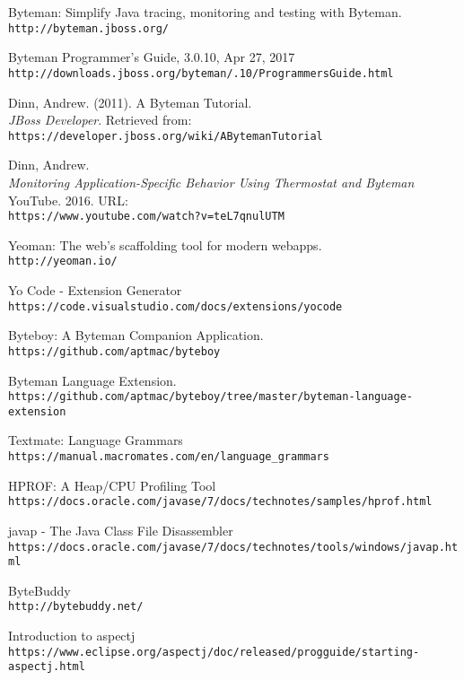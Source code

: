 \documentclass[letterpaper,twocolumn,10pt]{article}
\begin{document}
\begin{thebibliography}{99}

Byteman: Simplify Java tracing, monitoring and testing with Byteman.
\\\texttt{http://byteman.jboss.org/}

Byteman Programmer's Guide, 3.0.10, Apr 27, 2017
\\\texttt{http://downloads.jboss.org/byteman/.10/ProgrammersGuide.html}

Dinn, Andrew. (2011). A Byteman Tutorial. 
\\\textit{JBoss Developer}. Retrieved from: \\\texttt{https://developer.jboss.org/wiki/\newline ABytemanTutorial}

Dinn, Andrew. \\\textit{Monitoring Application-Specific Behavior Using Thermostat and Byteman}
YouTube. 2016. URL: \\\texttt{https://www.youtube.com/watch?v=teL7qnulUTM}

Yeoman: The web's scaffolding tool for modern webapps.
\\\texttt{http://yeoman.io/}

Yo Code - Extension Generator
\\\texttt{https://code.visualstudio.com/docs/\newline extensions/yocode}

Byteboy: A Byteman Companion Application.
\\\texttt{https://github.com/aptmac/byteboy}

Byteman Language Extension.
\\\texttt{https://github.com/aptmac/byteboy/tree/\newline master/byteman-language-extension}

Textmate: Language Grammars
\\\texttt{https://manual.macromates.com/en/\newline language\_grammars}

HPROF: A Heap/CPU Profiling Tool
\\\texttt{https://docs.oracle.com/javase/7/\newline docs/technotes/samples/hprof.html}

javap - The Java Class File Disassembler
\\\texttt{https://docs.oracle.com/javase/7/\newline docs/technotes/tools/windows/javap.html}

ByteBuddy
\\\texttt{http://bytebuddy.net/}

Introduction to aspectj
\\\texttt{https://www.eclipse.org/aspectj/doc/\newline released/progguide/starting-aspectj.html}

\end{thebibliography}
\end{document}
